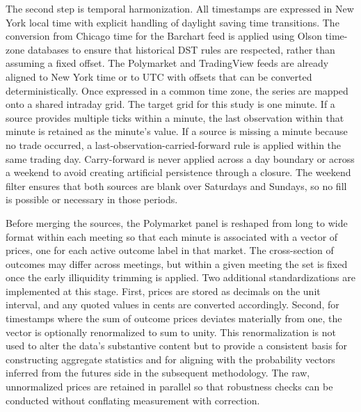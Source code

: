 The second step is temporal harmonization. All timestamps are expressed in New York local time with explicit handling of daylight saving time transitions. The conversion from Chicago time for the Barchart feed is applied using Olson time-zone databases to ensure that historical DST rules are respected, rather than assuming a fixed offset. The Polymarket and TradingView feeds are already aligned to New York time or to UTC with offsets that can be converted deterministically. Once expressed in a common time zone, the series are mapped onto a shared intraday grid. The target grid for this study is one minute. If a source provides multiple ticks within a minute, the last observation within that minute is retained as the minute’s value. If a source is missing a minute because no trade occurred, a last-observation-carried-forward rule is applied within the same trading day. Carry-forward is never applied across a day boundary or across a weekend to avoid creating artificial persistence through a closure. The weekend filter ensures that both sources are blank over Saturdays and Sundays, so no fill is possible or necessary in those periods.

Before merging the sources, the Polymarket panel is reshaped from long to wide format within each meeting so that each minute is associated with a vector of prices, one for each active outcome label in that market. The cross-section of outcomes may differ across meetings, but within a given meeting the set is fixed once the early illiquidity trimming is applied. Two additional standardizations are implemented at this stage. First, prices are stored as decimals on the unit interval, and any quoted values in cents are converted accordingly. Second, for timestamps where the sum of outcome prices deviates materially from one, the vector is optionally renormalized to sum to unity. This renormalization is not used to alter the data’s substantive content but to provide a consistent basis for constructing aggregate statistics and for aligning with the probability vectors inferred from the futures side in the subsequent methodology. The raw, unnormalized prices are retained in parallel so that robustness checks can be conducted without conflating measurement with correction.



